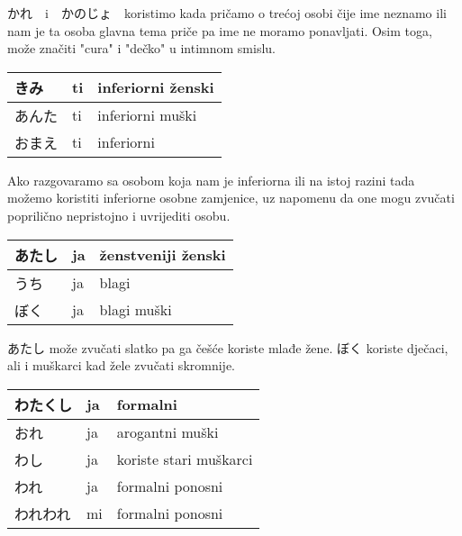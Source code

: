 	\vspace{10pt}
	
	かれ　i　かのじょ　koristimo kada pričamo o trećoj osobi čije ime neznamo ili nam je ta osoba glavna tema priče pa ime ne moramo ponavljati. Osim toga, može značiti "cura" i "dečko" u intimnom smislu.
	
	\begin{reibun}
	\end{reibun}
	
	\begin{tabular}{|l|l|l|}
		\hline
		きみ&ti&inferiorni ženski\\\hline
		あんた&ti&inferiorni muški\\\hline
		おまえ&ti&inferiorni\\\hline
	\end{tabular}
	
	\vspace{10pt}
	
		Ako razgovaramo sa osobom koja nam je inferiorna ili na istoj razini tada možemo koristiti inferiorne osobne zamjenice, uz napomenu da one mogu zvučati poprilično nepristojno i uvrijediti osobu.
		
		\vspace{15pt}
	
	\newpage
		
	\begin{tabular}{|l|l|l|}
		\hline
		あたし&ja&ženstveniji ženski\\\hline
		うち&ja&blagi\\\hline
		ぼく&ja&blagi muški\\\hline
	\end{tabular}
	
	\vspace{10pt}
	
	あたし može zvučati slatko pa ga češće koriste mlađe žene. ぼく koriste dječaci, ali i muškarci kad žele zvučati skromnije.
	
	
	\vspace{10pt}
	
	\begin{tabular}{|l|l|l|}
		\hline
		わたくし&ja&formalni\\\hline
		おれ&ja&arogantni muški\\\hline
		わし&ja&koriste stari muškarci\\\hline
		われ&ja&formalni ponosni\\\hline
		われわれ&mi&formalni ponosni\\\hline
	\end{tabular}

